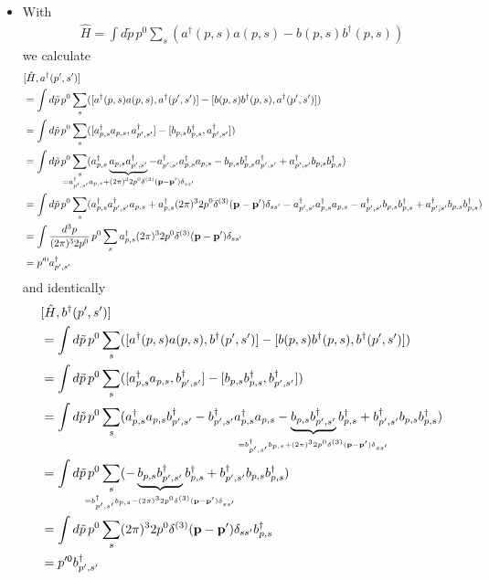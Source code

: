 \documentclass[10pt,a4paper]{report}
\theoremstyle{definition}
\begin{document}
\begin{itemize}
\item With
\begin{align}
\hat{H}=\int d\tilde{p}\,p^0\sum_s(a^\dagger(p,s)a(p,s)-b(p,s)b^\dagger(p,s))
\end{align}
we calculate
\begin{align}
&[\hat{H},a^\dagger(p',s')]\\
&=\int d\tilde{p}\,p^0\sum_s(
[a^\dagger(p,s)a(p,s),a^\dagger(p',s')]-[b(p,s)b^\dagger(p,s),a^\dagger(p',s')])\\
&=\int d\tilde{p}\,p^0\sum_s(
[a^\dagger_{p,s}a_{p,s},a^\dagger_{p',s'}]-[b_{p,s}b^\dagger_{p,s},a^\dagger_{p',s'}])\\
&=\int d\tilde{p}\,p^0\sum_s(
a^\dagger_{p,s}\underbrace{a_{p,s}a^\dagger_{p',s'}}_{\mathclap{=a^\dagger_{p',s'}a_{p,s}+(2\pi)^32p^0\delta^{(3)}(\mathbf{p}-\mathbf{p}')\delta_{ss'}}}
-a^\dagger_{p',s'}a^\dagger_{p,s}a_{p,s}
-b_{p,s}b^\dagger_{p,s}a^\dagger_{p',s'}
+a^\dagger_{p',s'}b_{p,s}b^\dagger_{p,s})\\
&=\int d\tilde{p}\,p^0\sum_s(
a^\dagger_{p,s}a^\dagger_{p',s'}a_{p,s}+a^\dagger_{p,s}(2\pi)^32p^0\delta^{(3)}(\mathbf{p}-\mathbf{p}')\delta_{ss'}
-a^\dagger_{p',s'}a^\dagger_{p,s}a_{p,s}
-a^\dagger_{p',s'}b_{p,s}b^\dagger_{p,s}
+a^\dagger_{p',s'}b_{p,s}b^\dagger_{p,s})\\
&=\int \frac{d^3p}{(2\pi)^32p^0}\,p^0\sum_s
a^\dagger_{p,s}(2\pi)^32p^0\delta^{(3)}(\mathbf{p}-\mathbf{p}')\delta_{ss'}\\
&=p'^0a^\dagger_{p',s'}
\end{align}
and identically
\begin{align}
&[\hat{H},b^\dagger(p',s')]\\
&=\int d\tilde{p}\,p^0\sum_s(
[a^\dagger(p,s)a(p,s),b^\dagger(p',s')]-[b(p,s)b^\dagger(p,s),b^\dagger(p',s')])\\
&=\int d\tilde{p}\,p^0\sum_s(
[a^\dagger_{p,s}a_{p,s},b^\dagger_{p',s'}]-[b_{p,s}b^\dagger_{p,s},b^\dagger_{p',s'}])\\
&=\int d\tilde{p}\,p^0\sum_s(
a^\dagger_{p,s}a_{p,s}b^\dagger_{p',s'}
-b^\dagger_{p',s'}a^\dagger_{p,s}a_{p,s}
-\underbrace{b_{p,s}b^\dagger_{p',s'}}_{_{\mathclap{=b^\dagger_{p',s'}b_{p,s}+(2\pi)^32p^0\delta^{(3)}(\mathbf{p}-\mathbf{p}')\delta_{ss'}}}}b^\dagger_{p,s}
+b^\dagger_{p',s'}b_{p,s}b^\dagger_{p,s})\\
&=\int d\tilde{p}\,p^0\sum_s(
-\underbrace{b_{p,s}b^\dagger_{p',s'}}_{_{\mathclap{=b^\dagger_{p',s'}b_{p,s}-(2\pi)^32p^0\delta^{(3)}(\mathbf{p}-\mathbf{p}')\delta_{ss'}}}}b^\dagger_{p,s}
+b^\dagger_{p',s'}b_{p,s}b^\dagger_{p,s})\\
&=\int d\tilde{p}\,p^0\sum_s(2\pi)^32p^0\delta^{(3)}(\mathbf{p}-\mathbf{p}')\delta_{ss'}b^\dagger_{p,s}\\
&=p'^0b^\dagger_{p',s'}
\end{align}
\end{itemize}
\end{document}
